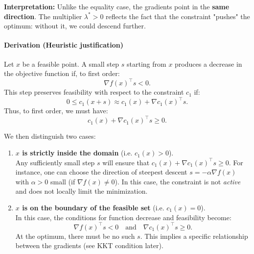 \begin{figureexplanation}
\textbf{Interpretation:} Unlike the equality case, the gradients point in the \textbf{same direction}. The multiplier $\lambda^* > 0$ reflects the fact that the constraint "pushes" the optimum: without it, we could descend further.
\end{figureexplanation}

\paragraph{Derivation (Heuristic justification)}
Let $x$ be a feasible point.
A small step $s$ starting from $x$ produces a decrease in the objective function if, to first order:
\begin{equation}
    \nabla f(x)^\top s < 0.
\end{equation}
This step preserves feasibility with respect to the constraint $c_1$ if:
\begin{equation}
    0 \le c_1(x+s) \approx c_1(x) + \nabla c_1(x)^\top s.
\end{equation}
Thus, to first order, we must have:
\begin{equation}
    c_1(x) + \nabla c_1(x)^\top s \ge 0.
\end{equation}

We then distinguish two cases:
\begin{enumerate}
    \item \textbf{$x$ is strictly inside the domain} (i.e. $c_1(x) > 0$). \\
    Any sufficiently small step $s$ will ensure that $c_1(x) + \nabla c_1(x)^\top s \ge 0$. For instance, one can choose the direction of steepest descent $s = -\alpha \nabla f(x)$ with $\alpha > 0$ small (if $\nabla f(x) \neq 0$). In this case, the constraint is not \textit{active} and does not locally limit the minimization.
    
    \item \textbf{$x$ is on the boundary of the feasible set} (i.e. $c_1(x) = 0$). \\
    In this case, the conditions for function decrease and feasibility become:
    \begin{equation}
        \nabla f(x)^\top s < 0 \quad \text{and} \quad \nabla c_1(x)^\top s \ge 0.
    \end{equation}
    At the optimum, there must be no such $s$. This implies a specific relationship between the gradients (see KKT condition later).
\end{enumerate}




